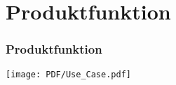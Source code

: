 \documentclass{beamer}
\begin{document}


\section{Produktfunktion}		
\begin{frame}
\frametitle{Produktfunktion}
\texttt{[image: PDF/Use\_Case.pdf]}
\end{frame}
	
\begin{frame}[title=Hauptgebaeude_Nacht.jpg]
\maketitle
\date{22. Mai 2018}
\end{frame}
\end{document}
